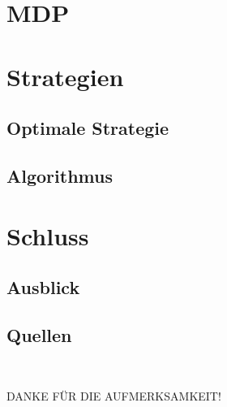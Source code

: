 \documentclass[18pt]{beamer}
\begin{document}
\section{MDP}


\section{Strategien}
\subsection{Optimale Strategie}

\subsection{Algorithmus}


\section{Schluss}
\subsection{Ausblick}

\subsection{Quellen}
\begin{frame}{~}
	\begin{center}
		\huge{DANKE FÜR DIE AUFMERKSAMKEIT!}
	\end{center}
\end{frame}
\end{document}
